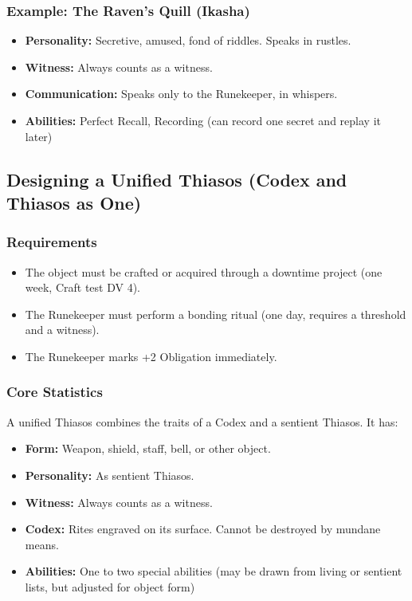 \subsubsection{Example: The Raven's Quill (Ikasha)}

\begin{itemize}
\item \textbf{Personality:} Secretive, amused, fond of riddles. Speaks in rustles.
\item \textbf{Witness:} Always counts as a witness.
\item \textbf{Communication:} Speaks only to the Runekeeper, in whispers.
\item \textbf{Abilities:} Perfect Recall, Recording (can record one secret and replay it later)
\end{itemize}

\subsection{Designing a Unified Thiasos (Codex and Thiasos as One)}

\subsubsection{Requirements}

\begin{itemize}
\item The object must be crafted or acquired through a downtime project (one week, Craft test DV 4).
\item The Runekeeper must perform a bonding ritual (one day, requires a threshold and a witness).
\item The Runekeeper marks +2 Obligation immediately.
\end{itemize}

\subsubsection{Core Statistics}

A unified Thiasos combines the traits of a Codex and a sentient Thiasos. It has:

\begin{itemize}
\item \textbf{Form:} Weapon, shield, staff, bell, or other object.
\item \textbf{Personality:} As sentient Thiasos.
\item \textbf{Witness:} Always counts as a witness.
\item \textbf{Codex:} Rites engraved on its surface. Cannot be destroyed by mundane means.
\item \textbf{Abilities:} One to two special abilities (may be drawn from living or sentient lists, but adjusted for object form)
\end{itemize}

